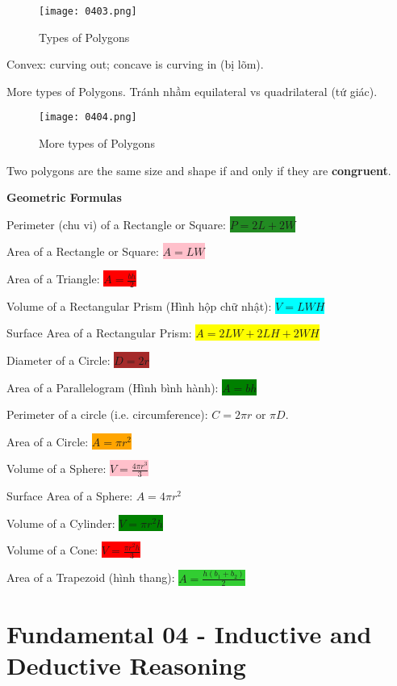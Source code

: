 \begin{figure}[htb!]
  \centering
  \texttt{[image: 0403.png]}
  \caption{Types of Polygons}
\end{figure}

Convex: curving out; concave is curving in (bị lõm).

\vspace{1cm}

\newpage

More types of Polygons. Tránh nhầm equilateral vs quadrilateral (tứ giác).

\begin{figure}[htb!]
  \centering
  \texttt{[image: 0404.png]}
  \caption{More types of Polygons}
\end{figure}

Two polygons are the same size and shape if and only if they are \textbf{congruent}.

\vspace{0.9 cm}

\centerline{\textbf{\huge Geometric Formulas}}

\vspace{0.2 cm}

Perimeter (chu vi) of a Rectangle or Square: \colorbox{ForestGreen}{$P=2L+2W$}

Area of a Rectangle or Square: \colorbox{pink}{$A=LW$}

Area of a Triangle: \colorbox{red}{$A=\frac{bh}{2}$}

Volume of a Rectangular Prism (Hình hộp chữ nhật): \colorbox{cyan}{$V=LWH$}

Surface Area of a Rectangular Prism: \colorbox{yellow}{$A=2LW+2LH+2WH$}

Diameter of a Circle: \colorbox{brown}{$D=2r$}

Area of a Parallelogram (Hình bình hành): \colorbox{green}{$A=bh$}

Perimeter of a circle (i.e. circumference): \colorbox{VioletRed}{$C=2\pi r$} or \colorbox{VioletRed}{$\pi D$}.

Area of a Circle: \colorbox{orange}{$A=\pi r^{2}$}

Volume of a Sphere: \colorbox{pink}{$V=\frac{4\pi r^{3}}{3}$}

Surface Area of a Sphere: \colorbox{BlueGreen}{$A=4\pi r^{2}$}

Volume of a Cylinder: \colorbox{green}{$V=\pi r^{2}h$}

Volume of a Cone: \colorbox{red}{$V=\frac{\pi r^{2}h}{3}$}

Area of a Trapezoid (hình thang): \colorbox{LimeGreen}{$A=\frac{h(b_{1}+b_{2})}{2}$}

\section{Fundamental 04 - Inductive and Deductive Reasoning}

